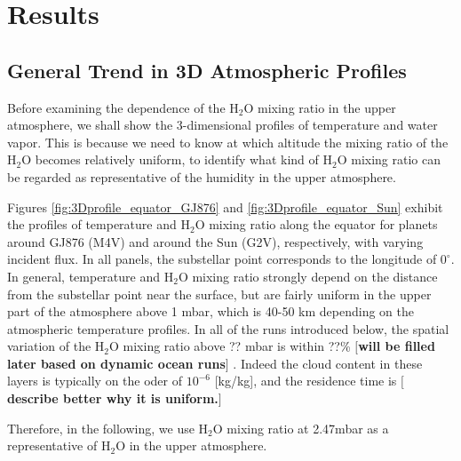 \documentclass[11pt,numberedappendix,twocolappendix,]{emulateapj}
\def\water{H$_2$O }
\def\preslevel{2.47}
\def\memo#1{\color{red}$[${\bf #1}$]$ \color{black}}
\begin{document}
\section{Results}
\label{s:results}

\subsection{General Trend in 3D Atmospheric Profiles}
\label{ss:result_H2Omixingratio}

Before examining the dependence of the \water mixing ratio in the upper atmosphere, we shall show the 3-dimensional profiles of temperature and water vapor. 
This is because we need to know at which altitude the mixing ratio of the \water becomes relatively uniform, to identify what kind of \water mixing ratio can be regarded as representative of the humidity in the upper atmosphere. 

Figures \ref{fig:3Dprofile_equator_GJ876} and \ref{fig:3Dprofile_equator_Sun} exhibit the profiles of temperature and \water mixing ratio along the equator for planets around GJ876 (M4V) and around the Sun (G2V), respectively, with varying incident flux. 
In all panels, the substellar point corresponds to the longitude of $0^{\circ }$. 
In general, temperature and \water mixing ratio strongly depend on the distance from the substellar point near the surface, but are fairly uniform in the upper part of the atmosphere above 1 mbar, which is 40-50 km depending on the atmospheric temperature profiles. 
In all of the runs introduced below, the spatial variation of the \water mixing ratio above ?? mbar is within ??\% \memo{will be filled later based on dynamic ocean runs}. 
Indeed the cloud content in these layers is typically on the oder of $10^{-6} $ [kg/kg], and the residence time is \memo{describe better why it is uniform.}

Therefore, in the following, we use \water mixing ratio at \preslevel mbar as a representative of \water in the upper atmosphere. 
\end{document}
